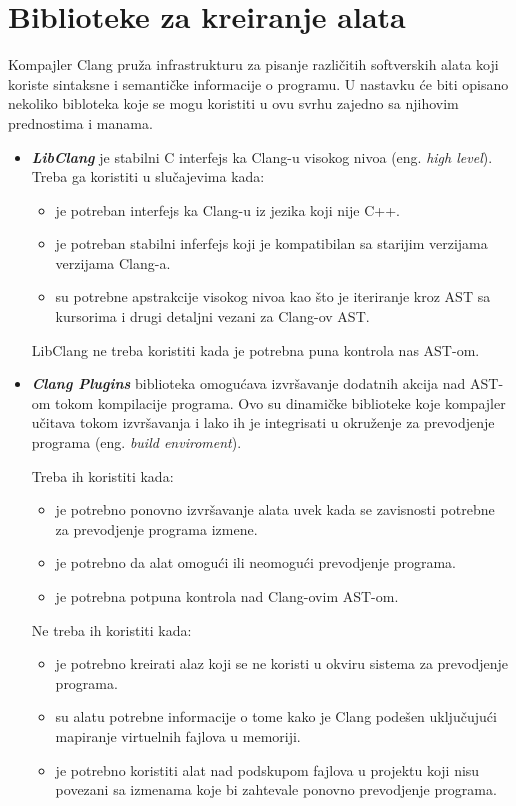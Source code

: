 \documentclass[12pt,oneside]{memoir}
\begin{document}
\section{Biblioteke za kreiranje alata}

 Kompajler Clang pru\v{z}a infrastrukturu za pisanje razli\v{c}itih softverskih alata koji koriste sintaksne i semanti\v{c}ke informacije o programu. U nastavku \'{c}e biti opisano nekoliko bibloteka koje se mogu koristiti u ovu svrhu zajedno sa njihovim prednostima i manama.


\begin{itemize}
\item \textit{\textbf{LibClang}} je stabilni C interfejs ka Clang-u visokog nivoa (eng. \textit{high level}).
Treba ga koristiti u slu\v{c}ajevima kada:
\begin{itemize}
  \item je potreban interfejs ka Clang-u iz jezika koji nije C++.
  \item je potreban stabilni inferfejs koji je kompatibilan sa starijim verzijama verzijama Clang-a.
  \item su potrebne apstrakcije visokog nivoa kao \v{s}to je iteriranje kroz AST sa kursorima i drugi detaljni vezani za Clang-ov AST.
\end{itemize}
LibClang ne treba koristiti kada je potrebna puna kontrola nas AST-om.

\item \textit{\textbf{Clang Plugins}} biblioteka omogu\'{c}ava izvr\v{s}avanje dodatnih akcija nad AST-om tokom kompilacije programa. Ovo su dinami\v{c}ke biblioteke koje kompajler u\v{c}itava tokom izvr\v{s}avanja i lako ih je integrisati u okru\v{z}enje za prevodjenje programa (eng. \textit{build enviroment}).

Treba ih koristiti kada:

\begin{itemize}
\item je potrebno ponovno izvr\v{s}avanje alata uvek kada se zavisnosti potrebne za prevodjenje programa izmene.
\item je potrebno da alat omogu\'{c}i ili neomogu\'{c}i prevodjenje programa.
\item je potrebna potpuna kontrola nad Clang-ovim AST-om.
\end{itemize}
Ne treba ih koristiti kada:
\begin{itemize}
\item je potrebno kreirati alaz koji se ne koristi u okviru sistema za prevodjenje programa.
\item su alatu potrebne informacije o tome kako je Clang pode\v{s}en uklju\v{c}uju\'{c}i mapiranje virtuelnih fajlova u memoriji.
\item je potrebno koristiti alat nad podskupom fajlova u projektu koji nisu povezani sa izmenama koje bi zahtevale ponovno prevodjenje programa.
\end{itemize}


\end{itemize}
\end{document}
